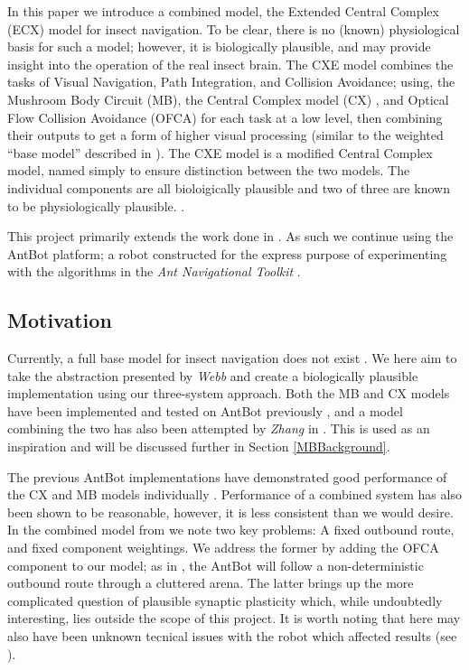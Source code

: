 \documentclass[a4paper,11pt,twoside,openright]{article}
\begin{document}
In this paper we introduce a combined model, the Extended Central Complex (ECX)
model for insect
navigation. To be clear, there is no (known) physiological basis for such a
model; however, it is biologically plausible, and may provide insight into
the operation of the real insect brain. The CXE model combines the tasks of
Visual Navigation, Path Integration, and Collision Avoidance; using, the Mushroom
Body Circuit (MB)\cite{Ardin2016}, the Central Complex model (CX)
\cite{Stone2017}, and Optical Flow Collision Avoidance (OFCA)\cite{Mitchell2018}
for each task at a low level, then combining their outputs to get a form of
higher visual processing (similar to the weighted ``base model'' described in
\cite{Webb2018}). The CXE model is a modified Central Complex model, named simply
to ensure distinction between the two models. The individual components are all
bioloigically plausible and two of three are known to be physiologically
plausible. \cite{Ardin2016, Stone2017, Mitchell2018}.
\newline
\par

This project primarily extends the work done in \cite{Mitchell2018}. As such we
continue using the AntBot platform; a robot constructed for the express purpose
of experimenting with the algorithms in the \textit{Ant Navigational Toolkit}
\cite{Wehner2009}.

\subsection{ Motivation }
Currently, a full base model for insect navigation does not exist
\cite{Webb2018}. We here aim to take the abstraction presented by \textit{Webb}
and create a biologically plausible implementation using our three-system
approach. Both the MB and CX models have been implemented and tested on AntBot
previously \cite{Scimeca2017, Mitchell2018, Eberding2016, Zhang2017}, and a model
combining the two has also been attempted by \textit{Zhang} in \cite{Zhang2017}.
This is used as an inspiration and will be discussed further in Section
\ref{MBBackground}.
\newline
\par

The previous AntBot implementations have demonstrated good performance of the CX
and MB models individually \cite{Scimeca2017, Mitchell2018}. Performance of
a combined system has also been shown to be reasonable, however, it is less
consistent than we would desire\cite{Zhang2017}. In the combined model from
\cite{Zhang2017} we note two key problems: A fixed outbound route, and fixed
component weightings. We address the former by adding the OFCA component to our
model; as in \cite{Mitchell2018}, the AntBot will follow a non-deterministic
outbound route through a cluttered arena. The latter brings up the more
complicated question of plausible synaptic plasticity which, while undoubtedly
interesting, lies outside the scope of this project. It is worth noting that here
may also have been unknown tecnical issues with the robot which affected results
(see \cite{Mitchell2018}).
\newline
\par
\end{document}
